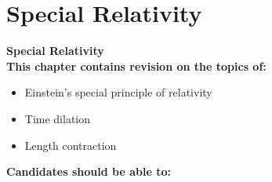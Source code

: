 \documentclass[main.tex]{subfiles}
\begin{document}
\chapter{Special Relativity}

\usepackage{tikz}
	\normalsize

\Large 
\bf Special Relativity
\normalfont
\normalsize
\\



This chapter contains revision on the topics of:

\begin {itemize}
\item Einstein’s special principle of relativity
\item Time dilation
\item Length contraction

\end {itemize}

\bf Candidates should be able to:
\normalfont
\end{document}
